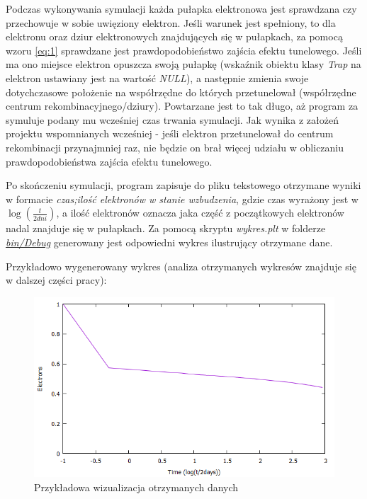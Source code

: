 Podczas wykonywania symulacji każda pułapka elektronowa jest sprawdzana czy przechowuje w sobie uwięziony elektron. Jeśli warunek jest spełniony, to dla elektronu oraz dziur elektronowych znajdujących się w pułapkach, za pomocą wzoru \ref{eq:1} sprawdzane jest prawdopodobieństwo zajścia efektu tunelowego. Jeśli ma ono miejsce elektron opuszcza swoją pułapkę (wskaźnik obiektu klasy \textit{Trap} na elektron ustawiany jest na wartość \textit{NULL}), a następnie zmienia swoje dotychczasowe położenie na współrzędne do których przetunelował (współrzędne centrum rekombinacyjnego/dziury). Powtarzane jest to tak długo, aż program za symuluje podany mu wcześniej czas trwania symulacji.  Jak wynika z założeń projektu wspomnianych wcześniej - jeśli elektron przetunelował do centrum rekombinacji przynajmniej raz, nie będzie on brał więcej udziału w obliczaniu prawdopodobieństwa zajścia efektu tunelowego. 

Po skończeniu symulacji, program zapisuje do pliku tekstowego otrzymane wyniki w formacie \textit{czas;ilość elektronów w stanie wzbudzenia}, gdzie czas wyrażony jest w $ \log(\frac{t}{2 dni}) $, a ilość elektronów oznacza jaka część z początkowych elektronów nadal znajduje się w pułapkach. Za pomocą skryptu \textit{wykres.plt}
w folderze \href{www}{\textit{bin/Debug}} generowany jest odpowiedni wykres ilustrujący otrzymane dane. 

Przykładowo wygenerowany wykres (analiza otrzymanych wykresów znajduje się w dalszej części pracy):

\begin{figure}[H]
\centering
\includegraphics[width=15cm]{example}
\caption{Przykładowa wizualizacja otrzymanych danych}
\label{fig:example}
\end{figure}

